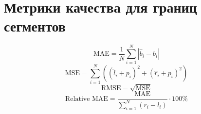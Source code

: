 \documentclass{article}%
\begin{document}
%
\normalsize%
\section{Метрики качества для границ сегментов}%
\label{sec:}%
\[%
\text{MAE} = \frac{1}{N} \sum_{i=1}^{N} \left| \hat{b}_i - b_i \right|%
\]%
\[%
\text{MSE} = \sum_{i=1}^{N} \left( (\hat{l}_i + p_i)^2 + (\hat{r}_i + p_i)^2 \right)%
\]%
\[%
\text{RMSE} = \sqrt{\text{MSE}}%
\]%
\[%
\text{Relative MAE} = \frac{\text{MAE}}{\sum_{i=1}^{N} (r_i - l_i)} \cdot 100\%%
\]

%
\end{document}

